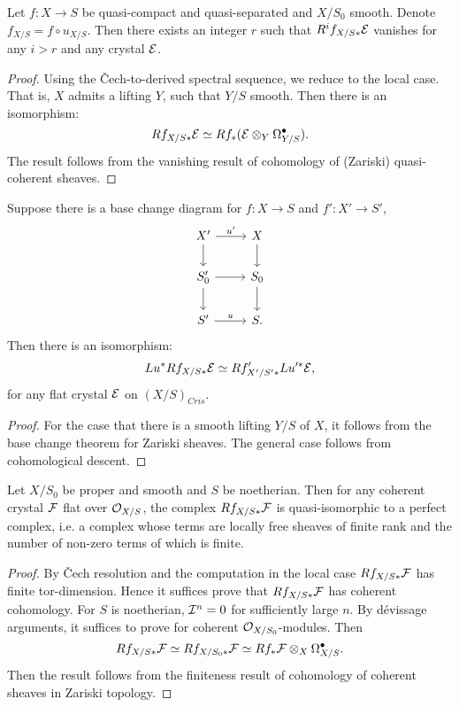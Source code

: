 \begin{theorem}
    Let $f \colon X \to S$ be quasi-compact 
    and quasi-separated and $X/S_0$ smooth. 
    Denote $f_{X/S} = f \circ u_{X/S}$. 
    Then there exists an integer $r$ such that 
    $R^i f_{X/S*} {\mathcal {E}}$ vanishes for any $i>r$ and any crystal ${\mathcal {E}}$.
\end{theorem}

\begin{proof}
    Using the \v Cech-to-derived spectral sequence, 
    we reduce to the local case. 
    That is, $X$ admits a lifting $Y$, such that $Y/S$ smooth. 
    Then there is an isomorphism:
    \[
        Rf_{X/S*} {\mathcal {E}} \simeq Rf_* ({\mathcal {E}} \otimes_Y \Omega_{Y/S}^\bullet).
    \]
    The result follows from the vanishing result of 
    cohomology of (Zariski) quasi-coherent sheaves.
\end{proof}
\begin{theorem}
    Suppose there is a base change diagram for 
    $f \colon X \to S$ and $f' \colon X' \to S'$,
    \[
        \begin{tikzcd}
            X' \ar[r,"{u'}"] \ar[d] & X \ar[d] \\
            S_0' \ar[r] \ar[d] & S_0 \ar[d] \\
            S' \ar[r,"u"] & S.
        \end{tikzcd}
    \]
    Then there is an isomorphism:
    \[
        Lu^* Rf_{X/S*} {\mathcal {E}} \simeq Rf'_{X'/S'*} Lu'^*{\mathcal {E}},
    \]
    for any flat crystal ${\mathcal {E}}$ on $(X/S)_{Cris}$.
\end{theorem}

\begin{proof}
    For the case that there is a smooth lifting $Y/S$ of $X$, 
    it follows from the base change theorem for Zariski sheaves. 
    The general case follows from cohomological descent.
\end{proof}

\begin{theorem}
    Let $X/S_0$ be proper and smooth and $S$ be noetherian. 
    Then for any coherent crystal ${\mathcal {F}}$ flat over ${\mathcal {O}}_{X/S}$, 
    the complex $Rf_{X/S*}{\mathcal {F}}$ is quasi-isomorphic to a perfect complex, 
    i.e. a complex whose terms are locally free sheaves of finite rank 
    and the number of non-zero terms of which is finite.
\end{theorem}

\begin{proof}
    By \v Cech resolution and the computation in the local case 
    $Rf_{X/S*} {\mathcal {F}}$ has finite tor-dimension. 
    Hence it suffices prove that $Rf_{X/S*} {\mathcal {F}}$ has coherent cohomology. 
    For $S$ is noetherian, ${\mathcal {I}}^n = 0$ for sufficiently large $n$. 
    By d\'evissage arguments, 
    it suffices to prove for coherent ${\mathcal {O}}_{X/S_0}$-modules. 
    Then 
    \[
        Rf_{X/S*} {\mathcal {F}} \simeq Rf_{X/S_0*} {\mathcal {F}} 
        \simeq Rf_* {\mathcal {F}} \otimes_X \Omega_{X/S}^\bullet.
    \]
    Then the result follows from the finiteness result 
    of cohomology of coherent sheaves in Zariski topology.
\end{proof}

